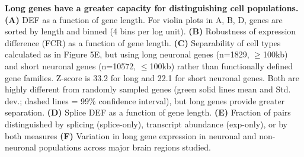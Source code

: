 \textbf{Long genes have a greater capacity for distinguishing cell populations. (A)} DEF as a function of gene length. For violin plots in A, B, D, genes are sorted by length and binned (4 bins per log unit). \textbf{(B)} Robustness of expression difference (FCR) as a function of gene length. \textbf{(C)} Separability of cell types calculated as in Figure 5E, but using long neuronal genes (n=1829, $\geq$100kb) and short neuronal genes (n=10572, $\leq$100kb) rather than functionally defined gene families. Z-score is 33.2 for long and 22.1 for short neuronal genes. Both are highly different from randomly sampled genes (green solid lines mean and Std. dev.; dashed lines = 99\% confidence interval), but long genes provide greater separation. \textbf{(D)} Splice DEF as a function of gene length. \textbf{(E)} Fraction of pairs distinguished by splicing (splice-only), transcript abundance (exp-only), or by both measures \textbf{(F)} Variation in long gene expression in neuronal and non-neuronal populations across major brain regions studied.  